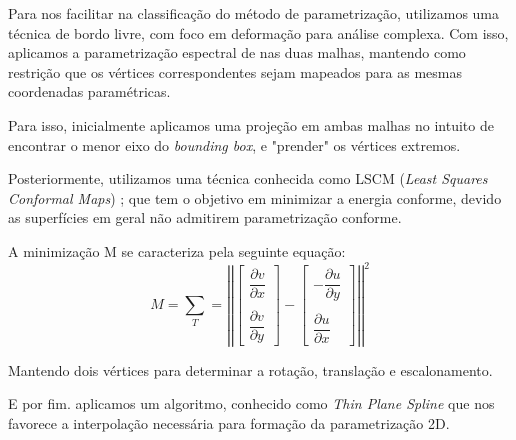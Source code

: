 Para nos facilitar na classificação do método de parametrização, utilizamos uma técnica de bordo livre, com foco em deformação para análise complexa. Com isso, aplicamos a parametrização espectral de \cite{Mullen} nas duas malhas, mantendo como restrição que os vértices correspondentes sejam mapeados para as mesmas coordenadas paramétricas.

Para isso, inicialmente aplicamos uma projeção em ambas malhas no intuito de encontrar o menor eixo do \textit{bounding box}, e "prender" os vértices extremos.
 
Posteriormente, utilizamos uma técnica conhecida como LSCM (\textit{Least Squares Conformal Maps}) \cite{Levy:2002}; que tem o objetivo em minimizar a energia conforme, devido as superfícies em geral não admitirem parametrização conforme.

A minimização M se caracteriza pela seguinte equação:
\[ M = \sum_{T}= \left|\left| \left[ \begin{array}{c}  \dfrac{\partial v}{\partial x} \\ \\  \dfrac{\partial v}{\partial y}  \end{array} \right] - \left[ \begin{array}{c}  -\dfrac{\partial u}{\partial y}  \\ \\ \dfrac{\partial u}{\partial x}  \end{array} \right] \right| \right|^{2} \]
\vspace*{0.3mm}

Mantendo dois vértices para determinar a rotação, translação e escalonamento.

E por fim. aplicamos um algoritmo, conhecido como \textit{Thin Plane Spline} \cite{Duchon} que nos favorece a interpolação necessária para formação da parametrização 2D.
%


%
%
%
%

